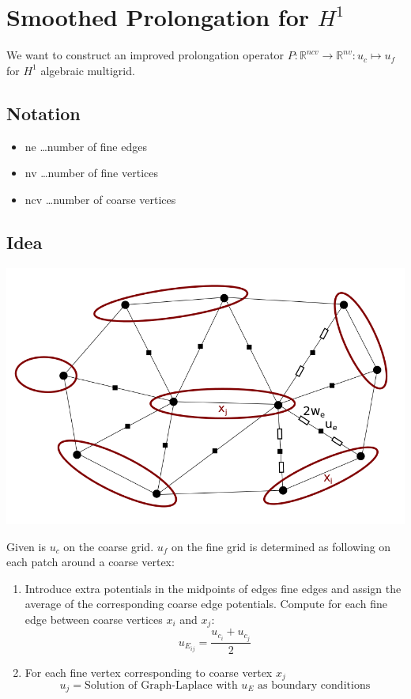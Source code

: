 \documentclass[a4paper,11pt]{scrartcl}
\newcommand{\R}{\mathbb{R}}
\begin{document}
\section{Smoothed Prolongation for $H^1$}
We want to construct an improved prolongation operator
$P: \R^{ncv} \rightarrow \R^{nv}: u_c \mapsto u_f$ for $H^1$ algebraic multigrid.

\subsection{Notation}
\begin{itemize}
  \item ne \dots number of fine edges
  \item nv \dots number of fine vertices
  \item ncv \dots number of coarse vertices
\end{itemize}

\subsection{Idea}
\includegraphics[width=0.6\linewidth]{pictures/h1_smoothed_diagram.png}

Given is $u_c$ on the coarse grid. $u_f$ on the fine grid is determined as following on each patch
around a coarse vertex:
\begin{enumerate}
  \item Introduce extra potentials in the midpoints of edges fine edges and assign the average
        of the corresponding coarse edge potentials.
        Compute for each fine edge between coarse vertices $x_i$ and $x_j$:
        \[ u_{E_{ij}} = \frac{u_{c_i} + u_{c_j}}{2} \]
  \item For each fine vertex corresponding to coarse vertex $x_j$
    \[ u_j = \text{Solution of Graph-Laplace with } u_E \text{ as boundary conditions} \]

\end{enumerate}
\end{document}
